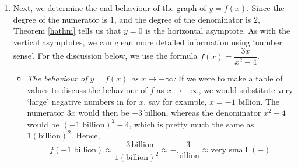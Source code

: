 {\begin{enumerate}
\begin{itemize}
\item  \textit{The behaviour of $y=f(x)$ as $x \rightarrow 2$:} Consider $x \rightarrow 2^{-}$. We imagine substituting $x = 1.999999$.  Approximating $f(x)$ as we did above, we get 
\begin{align*}
f(x) &\approx \dfrac{6}{\left( \mbox{very small $(-)$}\right)(4)} = \dfrac{3}{2 \left( \mbox{very small $(-)$}\right)}\\
  &\approx \dfrac{3}{\mbox{very small $(-)$}} \approx \mbox{very big $(-)$}
\end{align*}
We conclude that as $x \rightarrow 2^{-}$, $f(x) \rightarrow -\infty$.  Similarly, as $x \rightarrow 2^{+}$, we imagine substituting $x = 2.000001$ to get $f(x) \approx \frac{3}{\mbox{\scriptsize very small $(+)$}} \approx \mbox{very big (+)}$.  So as $x \rightarrow 2^{+}, f(x) \rightarrow \infty$.
\end{itemize}

The appearance of the graph $y=f(x)$  near $x=-2$ and $x=2$ is shown in Figure \ref{fig:ratgraph2}.



\drawexampleline

\item  Next, we determine the end behaviour of the graph of $y=f(x)$.  Since the degree of the numerator is $1$, and the degree of the denominator is $2$, Theorem \ref{hathm} tells us that $y=0$ is the horizontal asymptote.  As with the vertical asymptotes, we can glean more detailed information using `number sense'. For the discussion below, we use the formula $f(x) = \dfrac{3x}{x^2-4}$. 

\begin{itemize}

\item  \textit{The behaviour of $y=f(x)$ as $x \rightarrow -\infty$:}  If we were to make a table of values to discuss the behaviour of $f$ as $x \rightarrow -\infty$, we would substitute very `large' negative numbers in for $x$, say for example, $x = \mbox{$-1$ billion}$.  The numerator $3x$ would then be $-3 \, \mbox{billion}$, whereas the denominator $x^2-4$ would be $(\mbox{$-1$ billion})^2 - 4$, which is pretty much the same as  $1(\mbox{billion})^2$.  Hence, 
\[f\left(\mbox{$-1$ billion}\right) \approx \dfrac{-3 \, \mbox{billion}}{1(\mbox{billion})^2} \approx - \dfrac{3}{\mbox{billion}} \approx \mbox{very small $(-)$} \]


\end{itemize}
\end{enumerate}}
